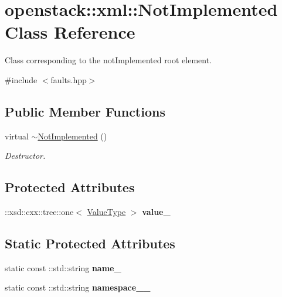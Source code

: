 \hypertarget{classopenstack_1_1xml_1_1NotImplemented}{
\section{openstack::xml::NotImplemented Class Reference}
\label{classopenstack_1_1xml_1_1NotImplemented}
}


Class corresponding to the notImplemented root element.  




{\ttfamily \#include $<$faults.hpp$>$}

\subsection*{Public Member Functions}
\begin{DoxyCompactItemize}
\item 
\hypertarget{classopenstack_1_1xml_1_1NotImplemented_aa11a450cf51b45a2dd310911b6fffcfa}{
virtual \hyperlink{classopenstack_1_1xml_1_1NotImplemented_aa11a450cf51b45a2dd310911b6fffcfa}{$\sim$NotImplemented} ()}
\label{classopenstack_1_1xml_1_1NotImplemented_aa11a450cf51b45a2dd310911b6fffcfa}

\begin{DoxyCompactList}\small\item\em Destructor. \item\end{DoxyCompactList}\end{DoxyCompactItemize}
\subsection*{Protected Attributes}
\begin{DoxyCompactItemize}
\item 
\hypertarget{classopenstack_1_1xml_1_1NotImplemented_a42b58a0534c1d333e7ade4e347b6cade}{
::xsd::cxx::tree::one$<$ \hyperlink{classopenstack_1_1xml_1_1NotImplementedAPIFault}{ValueType} $>$ {\bfseries value\_\-}}
\label{classopenstack_1_1xml_1_1NotImplemented_a42b58a0534c1d333e7ade4e347b6cade}

\end{DoxyCompactItemize}
\subsection*{Static Protected Attributes}
\begin{DoxyCompactItemize}
\item 
\hypertarget{classopenstack_1_1xml_1_1NotImplemented_a5aedf3237311b2208e9f0da14ce1a70a}{
static const ::std::string {\bfseries name\_\-}}
\label{classopenstack_1_1xml_1_1NotImplemented_a5aedf3237311b2208e9f0da14ce1a70a}

\item 
\hypertarget{classopenstack_1_1xml_1_1NotImplemented_abe8abde55f43b1b67b1341fc97f47de9}{
static const ::std::string {\bfseries namespace\_\-\_\-}}
\label{classopenstack_1_1xml_1_1NotImplemented_abe8abde55f43b1b67b1341fc97f47de9}

\end{DoxyCompactItemize}
